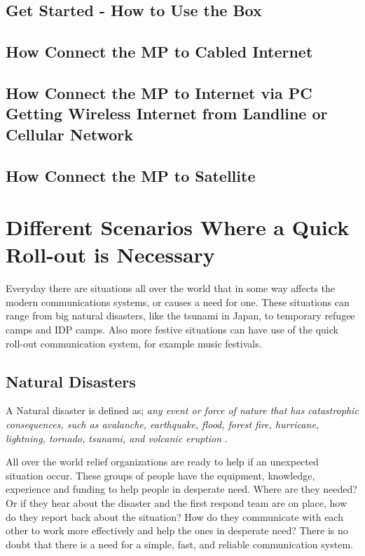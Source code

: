 \subsection{Get Started - How to Use the Box}



\subsection{How Connect the MP to Cabled Internet}
\label{subsec:cabledInternet}


\subsection{How Connect the MP to Internet via PC Getting Wireless Internet from Landline or Cellular Network}
\label{subsec:internetviaPC}

 


\subsection{How Connect the MP to Satellite}


 
\section{Different Scenarios Where a Quick Roll-out is Necessary}
Everyday there are situations all over the world that in some way affects the modern communications systems, or causes a need for one.  These situations can range from big natural disasters, like the tsunami in Japan, to temporary refugee camps and IDP camps. Also more festive situations can have use of the quick roll-out communication system, for example music festivals. 

\subsection{Natural Disasters}
A Natural disaster is defined as; \textit{any event or force of nature that has catastrophic consequences, such as avalanche, earthquake, flood, forest fire, hurricane, lightning, tornado, tsunami, and volcanic eruption} \cite{naturalDisaster}.

All over the world relief organizations are ready to help if an unexpected situation occur. These groups of people have the equipment, knowledge, experience and funding to help people in desperate need. Where are they needed? Or if they hear about the disaster and the first respond team are on place, how do they report back about the situation? How do they communicate with each other to work more effectively and help the ones in desperate need? There is no doubt that there is a need for a simple, fast, and reliable communication system.

